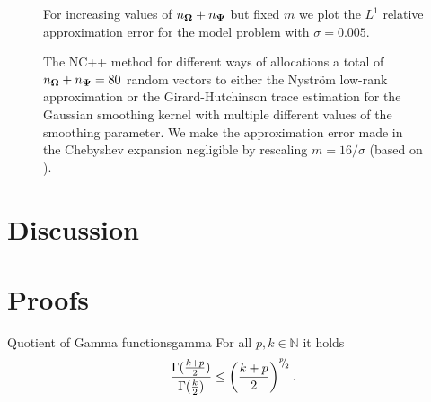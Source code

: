 \documentclass[12pt]{article}
\begin{document}
\begin{figure}[ht]
    \centering
    
    \caption{For increasing values of $n_{\boldsymbol{\Omega}} + n_{\boldsymbol{\Psi}}$ but fixed $m$ we plot the $L^1$ relative approximation error for the model problem with $\sigma=0.005$.}
    \label{fig:convergence}
\end{figure}


\begin{figure}[ht]
    \centering
    
    \caption{The NC++ method for different ways of allocations a total of $n_{\boldsymbol{\Omega}} + n_{\boldsymbol{\Psi}}=80$ random vectors to either the Nystr\"om low-rank approximation or the Girard-Hutchinson trace estimation for the Gaussian smoothing kernel with multiple different values of the smoothing parameter. We make the approximation error made in the Chebyshev expansion negligible by rescaling $m=16 / \sigma$ (based on ).}
    \label{fig:distribution}
\end{figure}


\section{Discussion}
\label{sec:discussion}



\clearpage


\appendix

\clearpage
\section{Proofs}

\begin{lemma}{Quotient of Gamma functions}{gamma}
    For all $p, k \in \mathbb{N}$ it holds
    \begin{equation}
        \frac{\Gamma(\frac{k + p}{2})}{\Gamma(\frac{k}{2})} \leq \left( \frac{k + p}{2} \right)^{{}^{p}{\mskip -5mu/\mskip -3mu}_{2}}.
    \end{equation}
\end{lemma}
\end{document}
